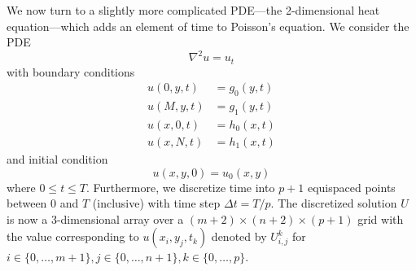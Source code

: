 \documentclass[conference]{IEEEtran}
\begin{document}
We now turn to a slightly more complicated PDE---the 2-dimensional heat equation---which adds an element of time to Poisson's equation. We consider the PDE
\begin{equation}
  \nabla^2 u = u_t
\end{equation}
with boundary conditions
\begin{align}
  u(0, y, t) &= g_0(y, t) \\
  u(M, y, t) &= g_1(y, t) \\
  u(x, 0, t) &= h_0(x, t) \\
  u(x, N, t) &= h_1(x, t)
\end{align}
and initial condition
\begin{equation}
  u(x, y, 0) = u_0(x, y)
\end{equation}
where $0 \le t \le T$. Furthermore, we discretize time into $p+1$ equispaced points between $0$ and $T$ (inclusive) with time step $\Delta t = T/p$. The discretized solution $U$ is now a 3-dimensional array over a $(m+2) \times (n+2) \times (p+1)$ grid with the value corresponding to $u(x_i, y_j, t_k)$ denoted by $U_{i,j}^k$ for $i \in \{0,\ldots,m+1\}, j \in \{0,\ldots,n+1\}, k \in \{0,\ldots,p\}$.
\end{document}
